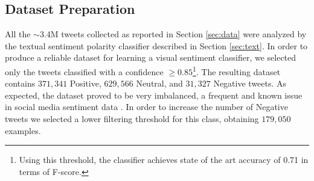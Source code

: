 \subsection{Dataset Preparation}
All the $\sim$3.4M tweets collected as reported in Section \ref{sec:data} were analyzed by the textual sentiment polarity classifier described in Section \ref{sec:text}. In order to produce a reliable dataset for learning a visual sentiment classifier, we selected only the tweets classified with a confidence $\geqslant 0.85$\footnote{Using this threshold, the classifier achieves state of the art accuracy of 0.71 in terms of F-score.}. The resulting dataset contains $371,341$ Positive, $629,566$ Neutral, and $31,327$ Negative tweets. As expected, the dataset proved to be very imbalanced, a frequent and known issue in social media sentiment data \cite{li2011semi}. In order to increase the number of Negative tweets we selected a lower filtering threshold for this class, obtaining $179,050$ examples.
